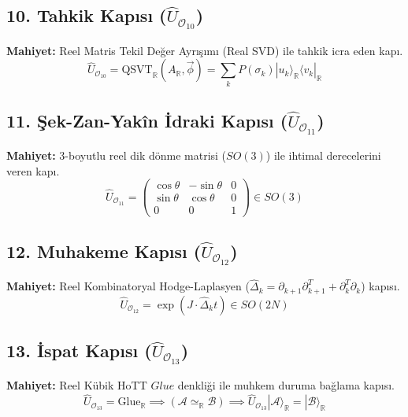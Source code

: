 \documentclass[11pt, a4paper]{article}
\begin{document}
\subsection{10. Tahkik Kapısı ($\hat{U}_{\mathcal{O}_{10}}$)}
\textbf{Mahiyet:} Reel Matris Tekil Değer Ayrışımı (Real SVD) ile tahkik icra eden kapı.
\begin{equation}
\hat{U}_{\mathcal{O}_{10}} = \text{QSVT}_{\mathbb{R}}(A_{\mathbb{R}}, \vec{\phi}) = \sum_k P(\sigma_k) |u_k\rangle_{\mathbb{R}} \langle v_k|_{\mathbb{R}}
\end{equation}

\subsection{11. Şek-Zan-Yakîn İdraki Kapısı ($\hat{U}_{\mathcal{O}_{11}}$)}
\textbf{Mahiyet:} 3-boyutlu reel dik dönme matrisi ($SO(3)$) ile ihtimal derecelerini veren kapı.
\begin{equation}
\hat{U}_{\mathcal{O}_{11}} = \begin{pmatrix} \cos\theta & -\sin\theta & 0 \\ \sin\theta & \cos\theta & 0 \\ 0 & 0 & 1 \end{pmatrix} \in SO(3)
\end{equation}

\subsection{12. Muhakeme Kapısı ($\hat{U}_{\mathcal{O}_{12}}$)}
\textbf{Mahiyet:} Reel Kombinatoryal Hodge-Laplasyen ($\hat{\Delta}_k = \partial_{k+1} \partial_{k+1}^T + \partial_k^T \partial_k$) kapısı.
\begin{equation}
\hat{U}_{\mathcal{O}_{12}} = \exp\left( J \cdot \hat{\Delta}_k t \right) \in SO(2N)
\end{equation}

\subsection{13. İspat Kapısı ($\hat{U}_{\mathcal{O}_{13}}$)}
\textbf{Mahiyet:} Reel Kübik HoTT $Glue$ denkliği ile muhkem duruma bağlama kapısı.
\begin{equation}
\hat{U}_{\mathcal{O}_{13}} = \text{Glue}_{\mathbb{R}} \implies (\mathcal{A} \simeq_{\mathbb{R}} \mathcal{B}) \implies \hat{U}_{\mathcal{O}_{13}} |\mathcal{A}\rangle_{\mathbb{R}} = |\mathcal{B}\rangle_{\mathbb{R}}
\end{equation}
\end{document}
